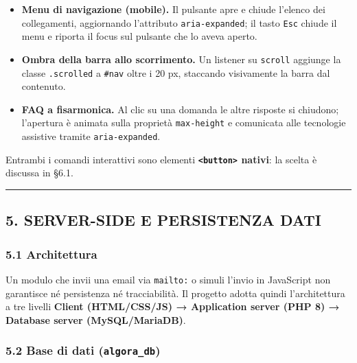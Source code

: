 \documentclass[
  11pt,
]{article}
\providecommand{\tightlist}{%
  \setlength{\itemsep}{0pt}\setlength{\parskip}{0pt}}
\begin{document}
\begin{itemize}
\tightlist
\item
  \textbf{Menu di navigazione (mobile).} Il pulsante apre e chiude
  l'elenco dei collegamenti, aggiornando l'attributo
  \texttt{aria-expanded}; il tasto \texttt{Esc} chiude il menu e riporta
  il focus sul pulsante che lo aveva aperto.
\item
  \textbf{Ombra della barra allo scorrimento.} Un listener su
  \texttt{scroll} aggiunge la classe \texttt{.scrolled} a \texttt{\#nav}
  oltre i 20 px, staccando visivamente la barra dal contenuto.
\item
  \textbf{FAQ a fisarmonica.} Al clic su una domanda le altre risposte
  si chiudono; l'apertura è animata sulla proprietà \texttt{max-height}
  e comunicata alle tecnologie assistive tramite \texttt{aria-expanded}.
\end{itemize}

Entrambi i comandi interattivi sono elementi
\textbf{\texttt{\textless{}button\textgreater{}} nativi}: la scelta è
discussa in §6.1.

\begin{center}\rule{0.5\linewidth}{0.5pt}\end{center}

\hypertarget{server-side-e-persistenza-dati}{%
\subsection{5. SERVER-SIDE E PERSISTENZA
DATI}\label{server-side-e-persistenza-dati}}

\hypertarget{architettura}{%
\subsubsection{5.1 Architettura}\label{architettura}}

Un modulo che invii una email via \texttt{mailto:} o simuli l'invio in
JavaScript non garantisce né persistenza né tracciabilità. Il progetto
adotta quindi l'architettura a tre livelli \textbf{Client (HTML/CSS/JS)
→ Application server (PHP 8) → Database server (MySQL/MariaDB)}.

\hypertarget{base-di-dati-algora_db}{%
\subsubsection{\texorpdfstring{5.2 Base di dati
(\texttt{algora\_db})}{5.2 Base di dati (algora\_db)}}\label{base-di-dati-algora_db}}
\end{document}

